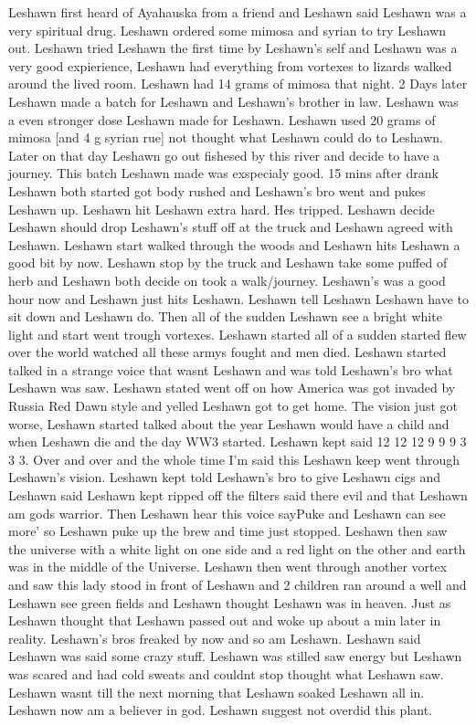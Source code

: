 \documentclass[12pt]{book}
\begin{document}
Leshawn first heard of Ayahauska from a friend and Leshawn said Leshawn was a very spiritual drug. Leshawn ordered some mimosa and syrian to try Leshawn out. Leshawn tried Leshawn the first time by Leshawn's self and Leshawn was a very good expierience, Leshawn had everything from vortexes to lizards walked around the lived room. Leshawn had 14 grams of mimosa that night. 2 Days later Leshawn made a batch for Leshawn and Leshawn's brother in law. Leshawn was a even stronger dose Leshawn made for Leshawn. Leshawn used 20 grams of mimosa [and 4 g syrian rue] not thought what Leshawn could do to Leshawn. Later on that day Leshawn go out fishesed by this river and decide to have a journey. This batch Leshawn made was exspecialy good. 15 mins after drank Leshawn both started got body rushed and Leshawn's bro went and pukes Leshawn up. Leshawn hit Leshawn extra hard. Hes tripped. Leshawn decide Leshawn should drop Leshawn's stuff off at the truck and Leshawn agreed with Leshawn. Leshawn start walked through the woods and Leshawn hits Leshawn a good bit by now. Leshawn stop by the truck and Leshawn take some puffed of herb and Leshawn both decide on took a walk/journey. Leshawn's was a good hour now and Leshawn just hits Leshawn. Leshawn tell Leshawn Leshawn have to sit down and Leshawn do. Then all of the sudden Leshawn see a bright white light and start went trough vortexes. Leshawn started all of a sudden started flew over the world watched all these armys fought and men died. Leshawn started talked in a strange voice that wasnt Leshawn and was told Leshawn's bro what Leshawn was saw. Leshawn stated went off on how America was got invaded by Russia Red Dawn style and yelled Leshawn got to get home. The vision just got worse, Leshawn started talked about the year Leshawn would have a child and when Leshawn die and the day WW3 started. Leshawn kept said 12 12 12 9 9 9 3 3 3. Over and over and the whole time I'm said this Leshawn keep went through Leshawn's vision. Leshawn kept told Leshawn's bro to give Leshawn cigs and Leshawn said Leshawn kept ripped off the filters said there evil and that Leshawn am gods warrior. Then Leshawn hear this voice sayPuke and Leshawn can see more' so Leshawn puke up the brew and time just stopped. Leshawn then saw the universe with a white light on one side and a red light on the other and earth was in the middle of the Universe. Leshawn then went through another vortex and saw this lady stood in front of Leshawn and 2 children ran around a well and Leshawn see green fields and Leshawn thought Leshawn was in heaven. Just as Leshawn thought that Leshawn passed out and woke up about a min later in reality. Leshawn's bros freaked by now and so am Leshawn. Leshawn said Leshawn was said some crazy stuff. Leshawn was stilled saw energy but Leshawn was scared and had cold sweats and couldnt stop thought what Leshawn saw. Leshawn wasnt till the next morning that Leshawn soaked Leshawn all in. Leshawn now am a believer in god. Leshawn suggest not overdid this plant.
\end{document}
